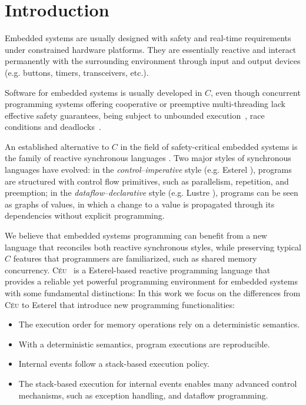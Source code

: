\documentclass{acm_proc_article-sp}
\newcommand{\CEU}{\textsc{C\'{e}u}\xspace}
\newcommand{\1}{\;}
\newcommand{\2}{\;\;}
\newcommand{\3}{\;\;\;}
\newcommand{\5}{\;\;\;\;\;}
\begin{document}


\section{Introduction}

Embedded systems are usually designed with safety and real-time requirements 
under constrained hardware platforms.
%
They are essentially reactive and interact permanently with the surrounding 
environment through input and output devices (e.g. buttons, timers, 
transceivers, etc.).

Software for embedded systems is usually developed in $C$, even though 
concurrent programming systems offering cooperative or preemptive 
multi-threading lack effective safety guarantees, being subject to unbounded 
execution~\cite{wsn.comparison}, race conditions and 
deadlocks~\cite{sync_async.threadsproblems}.

An established alternative to $C$ in the field of safety-critical embedded 
systems is the family of reactive synchronous languages \cite{rp.twelve}.
Two major styles of synchronous languages have evolved:
in the \emph{control}--\emph{imperative} style (e.g. Esterel 
\cite{esterel.design}), programs are structured with control flow primitives, 
such as parallelism, repetition, and preemption;
in the \emph{dataflow}--\emph{declarative} style (e.g. Lustre 
\cite{lustre.ieee91}), programs can be seen as graphs of values, in which a 
change to a value is propagated through its dependencies without explicit 
programming.

We believe that embedded systems programming can benefit from a new language 
that reconciles both reactive synchronous styles, while preserving typical $C$ 
features that programmers are familiarized, such as shared memory concurrency.
%
\CEU~\cite{ceu.sensys}
is a Esterel-based reactive programming language that provides a reliable yet 
powerful programming environment for embedded systems with some fundamental 
distinctions:
In this work we focus on the differences from \CEU to Esterel that introduce 
new programming functionalities:

%
\begin{itemize}
\item The execution order for memory operations rely on a deterministic 
semantics.
\item With a deterministic semantics, program executions are reproducible.
%
\item Internal events follow a stack-based execution policy.
\item The stack-based execution for internal events enables many advanced 
control mechanisms, such as exception handling, and dataflow programming.
\end{itemize}
\end{document}
